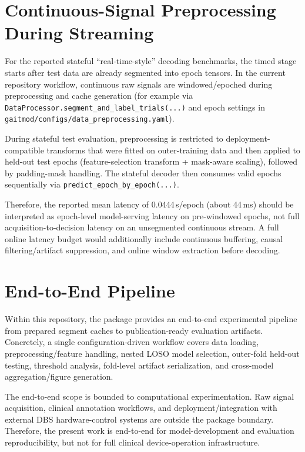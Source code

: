 \section{Continuous-Signal Preprocessing During Streaming}
\label{sec:reproducibility_streaming_preprocessing}
For the reported stateful ``real-time-style'' decoding benchmarks, the timed stage starts after test data are already segmented into epoch tensors. In the current repository workflow, continuous raw signals are windowed/epoched during preprocessing and cache generation (for example via \texttt{DataProcessor.segment\_and\_label\_trials(...)} and epoch settings in \texttt{gaitmod/configs/data\_preprocessing.yaml}).

During stateful test evaluation, preprocessing is restricted to deployment-compatible transforms that were fitted on outer-training data and then applied to held-out test epochs (feature-selection transform + mask-aware scaling), followed by padding-mask handling. The stateful decoder then consumes valid epochs sequentially via \texttt{predict\_epoch\_by\_epoch(...)}.

Therefore, the reported mean latency of 0.0444\,s/epoch (about 44\,ms) should be interpreted as epoch-level model-serving latency on pre-windowed epochs, not full acquisition-to-decision latency on an unsegmented continuous stream. A full online latency budget would additionally include continuous buffering, causal filtering/artifact suppression, and online window extraction before decoding.

\section{End-to-End Pipeline}
\label{sec:reproducibility_end_to_end}
Within this repository, the package provides an end-to-end experimental pipeline from prepared segment caches to publication-ready evaluation artifacts. Concretely, a single configuration-driven workflow covers data loading, preprocessing/feature handling, nested LOSO model selection, outer-fold held-out testing, threshold analysis, fold-level artifact serialization, and cross-model aggregation/figure generation.

The end-to-end scope is bounded to computational experimentation. Raw signal acquisition, clinical annotation workflows, and deployment/integration with external DBS hardware-control systems are outside the package boundary. Therefore, the present work is end-to-end for model-development and evaluation reproducibility, but not for full clinical device-operation infrastructure.

